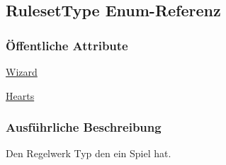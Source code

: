\hypertarget{a00066}{\subsection{Ruleset\-Type Enum-\/\-Referenz}
\label{a00066}
}
\subsubsection*{Öffentliche Attribute}
\begin{DoxyCompactItemize}
\item 
\hypertarget{a00066_a35e49e93bdb15f20f8e9940d3f54c887}{\hyperlink{a00066_a35e49e93bdb15f20f8e9940d3f54c887}{Wizard}}\label{a00066_a35e49e93bdb15f20f8e9940d3f54c887}

\item 
\hypertarget{a00066_a6e9f988fd4b1f5b39d289b0f44514af4}{\hyperlink{a00066_a6e9f988fd4b1f5b39d289b0f44514af4}{Hearts}}\label{a00066_a6e9f988fd4b1f5b39d289b0f44514af4}

\end{DoxyCompactItemize}


\subsubsection{Ausführliche Beschreibung}
Den Regelwerk Typ den ein Spiel hat. 
